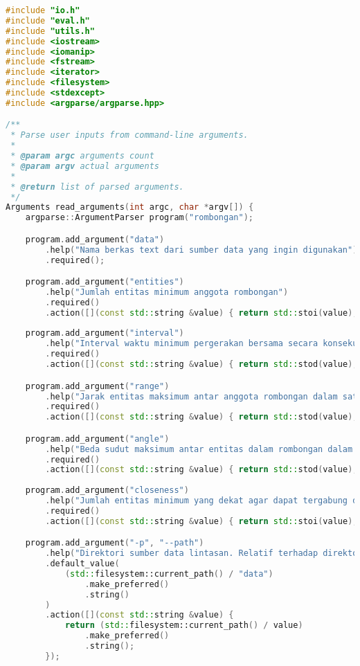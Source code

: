 \begin{lstlisting}[language=C++, caption=Implementasi 
modul \texttt{io.cpp},label={lamp:module-io}]
#include "io.h"
#include "eval.h"
#include "utils.h"
#include <iostream>
#include <iomanip>
#include <fstream>
#include <iterator>
#include <filesystem>
#include <stdexcept>
#include <argparse/argparse.hpp>

/**
 * Parse user inputs from command-line arguments.
 * 
 * @param argc arguments count
 * @param argv actual arguments
 * 
 * @return list of parsed arguments.
 */
Arguments read_arguments(int argc, char *argv[]) {
    argparse::ArgumentParser program("rombongan");

    program.add_argument("data")
        .help("Nama berkas text dari sumber data yang ingin digunakan")
        .required();

    program.add_argument("entities")
        .help("Jumlah entitas minimum anggota rombongan")
        .required()
        .action([](const std::string &value) { return std::stoi(value); });
    
    program.add_argument("interval")
        .help("Interval waktu minimum pergerakan bersama secara konsekutif dalam satuan frame")
        .required()
        .action([](const std::string &value) { return std::stod(value); });

    program.add_argument("range")
        .help("Jarak entitas maksimum antar anggota rombongan dalam satu waktu")
        .required()
        .action([](const std::string &value) { return std::stod(value); });

    program.add_argument("angle")
        .help("Beda sudut maksimum antar entitas dalam rombongan dalam derajat")
        .required()
        .action([](const std::string &value) { return std::stod(value); });
    
    program.add_argument("closeness")
        .help("Jumlah entitas minimum yang dekat agar dapat tergabung dalam rombongan")
        .required()
        .action([](const std::string &value) { return std::stoi(value); });

    program.add_argument("-p", "--path")
        .help("Direktori sumber data lintasan. Relatif terhadap direktori saat ini.")
        .default_value(
            (std::filesystem::current_path() / "data")
                .make_preferred()
                .string()
        )
        .action([](const std::string &value) {
            return (std::filesystem::current_path() / value)
                .make_preferred()
                .string();
        });


\end{lstlisting}
